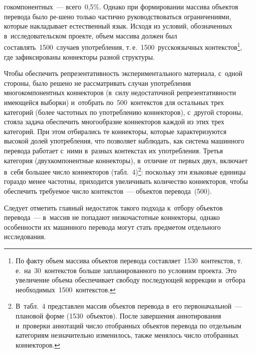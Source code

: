 \begin{multicols}{2}


  

\noindent
гокомпонентных~--- всего~0,5\%. Однако при
  формировании массива 
объектов перевода было %
 ре-\linebreak шено только частично руководствоваться 
огра\-ничениями, которые накладывает естественный язык.
 Ис\-ходя из условий, 
обозначенных в~исследовательском проекте, объем массива должен был 
со\-став\-лять~1500~случаев употребления, т.\,е.~1500~русскоязычных 
контекстов\footnote{По факту объем массива объектов перевода 
составляет~1530~контекстов, т.\,е.\ на~30~контекстов больше запланированного по 
условиям проекта. Это увеличение объема обеспечивает свободу последующей коррекции 
и~отбора необходимых~1500~контекстов.}, где зафиксированы коннекторы разной 
структуры. 

Чтобы обеспечить репрезентативность экспериментального 
материала, с~одной стороны, было решено не рассматривать случаи 
употребления многокомпонентных коннекторов (в~силу недостаточной 
репрезентативности имеющейся выборки) и~отобрать по~500~контекстов для 
остальных трех категорий (более частотных по употреблению коннекторов), 
с~другой стороны, стояла задача обеспечить многообразие коннекторов каждой 
из этих трех категорий. При этом отбирались те коннекторы, которые 
характеризуются высокой долей употребления, что позволяет наблюдать, как 
система машинного перевода работает с~ними в~разных контекстах их 
употребления. \mbox{Третья} категория (двухкомпонентные коннекторы), в~отличие от 
первых двух, включает в~себя большее число коннекторов 
(табл.~4)\footnote{В~табл.~4 представлен массив объектов перевода в~его 
первоначальной~--- плановой форме (1530~объектов). После завершения аннотирования 
и~проверки аннотаций число отобранных объектов перевода по отдельным категориям 
незначительно изменилось, также менялось число отобранных коннекторов.}: поскольку 
эти языковые единицы гораздо менее частотны, приходится увеличивать 
количество коннекторов, чтобы обеспечить требуемое число контекстов~--- 
объектов перевода~(500). 

Следует отметить главный недостаток такого подхода к~отбору объектов перевода~--- 
в~массив не попадают низкочастотные 
коннекторы, однако особенности их машинного перевода могут стать 
предметом отдельного исследования.


  \begin{table*}\small %
  \begin{center}
  \vspace*{2ex}
  

\end{center}
\end{table*}
\end{multicols}
